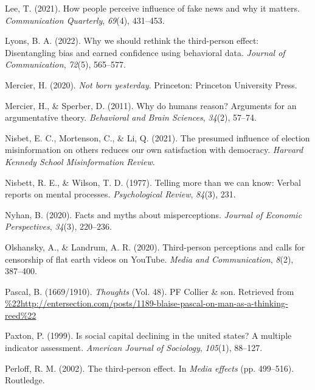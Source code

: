 \documentclass[
  ,jou,floatsintext]{apa6}
\newlength{\cslhangindent}
\newlength{\cslentryspacingunit} %
\newenvironment{CSLReferences}[2] %
 {%
  \setlength{\parindent}{0pt}
  \ifodd #1
  \let\oldpar\par
  \def\par{\hangindent=\cslhangindent\oldpar}
  \fi
  \setlength{\parskip}{#2\cslentryspacingunit}
 }%
 {}
\begin{document}
\begin{CSLReferences}{1}{0}
\leavevmode{}%
Lee, T. (2021). How people perceive influence of fake news and why it matters. \emph{Communication Quarterly}, \emph{69}(4), 431--453.

\leavevmode{}%
Lyons, B. A. (2022). Why we should rethink the third-person effect: Disentangling bias and earned confidence using behavioral data. \emph{Journal of Communication}, \emph{72}(5), 565--577.

\leavevmode{}%
Mercier, H. (2020). \emph{Not born yesterday}. Princeton: Princeton University Press.

\leavevmode{}%
Mercier, H., \& Sperber, D. (2011). Why do humans reason? Arguments for an argumentative theory. \emph{Behavioral and Brain Sciences}, \emph{34}(2), 57--74.

\leavevmode{}%
Nisbet, E. C., Mortenson, C., \& Li, Q. (2021). The presumed influence of election misinformation on others reduces our own satisfaction with democracy. \emph{Harvard Kennedy School Misinformation Review}.

\leavevmode{}%
Nisbett, R. E., \& Wilson, T. D. (1977). Telling more than we can know: Verbal reports on mental processes. \emph{Psychological Review}, \emph{84}(3), 231.

\leavevmode{}%
Nyhan, B. (2020). Facts and myths about misperceptions. \emph{Journal of Economic Perspectives}, \emph{34}(3), 220--236.

\leavevmode{}%
Olshansky, A., \& Landrum, A. R. (2020). Third-person perceptions and calls for censorship of flat earth videos on YouTube. \emph{Media and Communication}, \emph{8}(2), 387--400.

\leavevmode{}%
Pascal, B. (1669/1910). \emph{Thoughts} (Vol. 48). PF Collier \& son. Retrieved from \url{\%22http://entersection.com/posts/1189-blaise-pascal-on-man-as-a-thinking-reed\%22}

\leavevmode{}%
Paxton, P. (1999). Is social capital declining in the united states? A multiple indicator assessment. \emph{American Journal of Sociology}, \emph{105}(1), 88--127.

\leavevmode{}%
Perloff, R. M. (2002). The third-person effect. In \emph{Media effects} (pp. 499--516). Routledge.


\end{CSLReferences}
\end{document}
